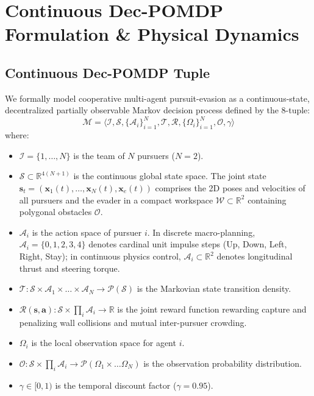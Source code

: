 \documentclass[conference]{IEEEtran}
\begin{document}
\section{Continuous Dec-POMDP Formulation \& Physical Dynamics}

\subsection{Continuous Dec-POMDP Tuple}
We formally model cooperative multi-agent pursuit-evasion as a continuous-state, decentralized partially observable Markov decision process defined by the 8-tuple:
\begin{equation}
    \mathcal{M} = \big\langle \mathcal{I}, \mathcal{S}, \{\mathcal{A}_i\}_{i=1}^N, \mathcal{T}, \mathcal{R}, \{\Omega_i\}_{i=1}^N, \mathcal{O}, \gamma \big\rangle
\end{equation}
where:
\begin{itemize}
    \item $\mathcal{I} = \{1, \dots, N\}$ is the team of $N$ pursuers ($N=2$).
    \item $\mathcal{S} \subset \mathbb{R}^{4(N+1)}$ is the continuous global state space. The joint state $\mathbf{s}_t = (\mathbf{x}_1(t), \dots, \mathbf{x}_N(t), \mathbf{x}_e(t))$ comprises the 2D poses and velocities of all pursuers and the evader in a compact workspace $\mathcal{W} \subset \mathbb{R}^2$ containing polygonal obstacles $\mathcal{O}$.
    \item $\mathcal{A}_i$ is the action space of pursuer $i$. In discrete macro-planning, $\mathcal{A}_i = \{0, 1, 2, 3, 4\}$ denotes cardinal unit impulse steps (Up, Down, Left, Right, Stay); in continuous physics control, $\mathcal{A}_i \subset \mathbb{R}^2$ denotes longitudinal thrust and steering torque.
    \item $\mathcal{T}: \mathcal{S} \times \mathcal{A}_1 \times \dots \times \mathcal{A}_N \to \mathcal{P}(\mathcal{S})$ is the Markovian state transition density.
    \item $\mathcal{R}(\mathbf{s}, \mathbf{a}): \mathcal{S} \times \prod_i \mathcal{A}_i \to \mathbb{R}$ is the joint reward function rewarding capture and penalizing wall collisions and mutual inter-pursuer crowding.
    \item $\Omega_i$ is the local observation space for agent $i$.
    \item $\mathcal{O}: \mathcal{S} \times \prod_i \mathcal{A}_i \to \mathcal{P}(\Omega_1 \times \dots \Omega_N)$ is the observation probability distribution.
    \item $\gamma \in [0, 1)$ is the temporal discount factor ($\gamma = 0.95$).
\end{itemize}
\end{document}
